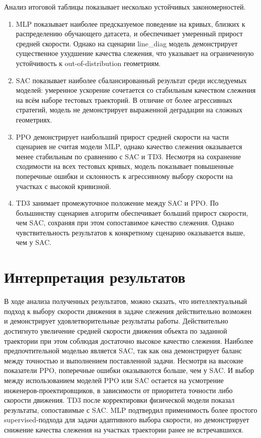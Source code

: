 Анализ итоговой таблицы показывает несколько устойчивых закономерностей.
\begin{enumerate}
    \item MLP показывает наиболее предсказуемое поведение на кривых, близких к распределению обучающего датасета, и обеспечивает умеренный прирост средней скорости. Однако на сценарии line\_diag модель демонстрирует существенное ухудшение качества слежения, что указывает на ограниченную устойчивость к out-of-distribution геометриям.
    \item SAC показывает наиболее сбалансированный результат среди исследуемых моделей: умеренное ускорение сочетается со стабильным качеством слежения на всём наборе тестовых траекторий. В отличие от более агрессивных стратегий, модель не демонстрирует выраженной деградации на сложных геометриях.
    \item PPO демонстрирует наибольший прирост средней скорости на части сценариев не считая модели MLP, однако качество слежения оказывается менее стабильным по сравнению с SAC и TD3. Несмотря на сохранение сходимости на всех тестовых кривых, модель показывает повышенные поперечные ошибки и склонность к агрессивному выбору скорости на участках с высокой кривизной.
    \item TD3 занимает промежуточное положение между SAC и PPO. По большинству сценариев алгоритм обеспечивает больший прирост скорости, чем SAC, сохраняя при этом сопоставимое качество слежения. Однако чувствительность результатов к конкретному сценарию оказывается выше, чем у SAC.
\end{enumerate}

\section{Интерпретация результатов}

В ходе анализа полученных результатов, можно сказать, что интеллектуальный подход к выбору скорости движения в задаче слежения действительно возможен и демонстрирует удовлетворительные результаты работы.
Действительно достигнуто увеличение средней скорости движения объекта по заданной траектории при этом соблюдая достаточно высокое качество слежения.
Наиболее предпочтительной моделью является SAC, так как она демонстрирует баланс между точностью и выполнением поставленной задачи.
Несмотря на высокие показатели PPO, поперечные ошибки оказываются больше, чем у SAC.
И выбор между использованием моделей PPO или SAC остается на усмотрение инженеров-проектировщиков, в зависимости от приоритета точности либо скорости движения.
TD3 после корректировки физической модели показал результаты, сопоставимые с SAC.
MLP подтвердил применимость более простого supervised-подхода для задачи адаптивного выбора скорости, но демонстрирует снижение качества слежения на участках траектории ранее не встречавшихся.

